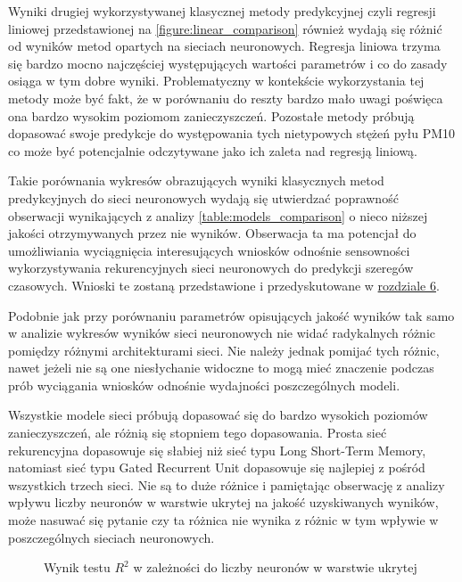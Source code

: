 \documentclass[10pt,a4paper]{article}
\begin{document}
Wyniki drugiej wykorzystywanej klasycznej metody predykcyjnej czyli regresji liniowej przedstawionej na \autoref{figure:linear_comparison} również wydają się różnić od wyników metod opartych na sieciach neuronowych. Regresja liniowa trzyma się bardzo mocno najczęściej występujących wartości parametrów i co do zasady osiąga w tym dobre wyniki. Problematyczny w kontekście wykorzystania tej metody może być fakt, że w porównaniu do reszty bardzo mało uwagi poświęca ona bardzo wysokim poziomom zanieczyszczeń. Pozostałe metody próbują dopasować swoje predykcje do występowania tych nietypowych stężeń pyłu PM10 co może być potencjalnie odczytywane jako ich zaleta nad regresją liniową. 

Takie porównania wykresów obrazujących wyniki klasycznych metod predykcyjnych do sieci neuronowych wydają się utwierdzać poprawność obserwacji wynikających z analizy \autoref{table:models_comparison} o nieco niższej jakości otrzymywanych przez nie wyników. Obserwacja ta ma potencjał do umożliwiania wyciągnięcia interesujących wniosków odnośnie sensowności wykorzystywania rekurencyjnych sieci neuronowych do predykcji szeregów czasowych. Wnioski te zostaną przedstawione i przedyskutowane w \hyperlink{section.6}{rozdziale 6}.

Podobnie jak przy porównaniu parametrów opisujących jakość wyników tak samo w analizie wykresów wyników sieci neuronowych nie widać radykalnych różnic pomiędzy różnymi architekturami sieci. Nie należy jednak pomijać tych różnic, nawet jeżeli nie są one niesłychanie widoczne to mogą mieć znaczenie podczas prób wyciągania wniosków odnośnie wydajności poszczególnych modeli. 

Wszystkie modele sieci próbują dopasować się do bardzo wysokich poziomów zanieczyszczeń, ale różnią się stopniem tego dopasowania. Prosta sieć rekurencyjna dopasowuje się słabiej niż sieć typu Long Short-Term Memory, natomiast sieć typu Gated Recurrent Unit dopasowuje się najlepiej z pośród wszystkich trzech sieci. Nie są to duże różnice i pamiętając obserwację z analizy wpływu liczby neuronów w warstwie ukrytej na jakość uzyskiwanych wyników, może nasuwać się pytanie czy ta różnica nie wynika z różnic w tym wpływie w poszczególnych sieciach neuronowych. 

\begin{figure}[!ht]
	\centering
	\caption{Wynik testu $R^2$ w zależności do liczby neuronów w warstwie ukrytej}
	\label{figure:neurons_comparison}
\end{figure}
\FloatBarrier
\end{document}
